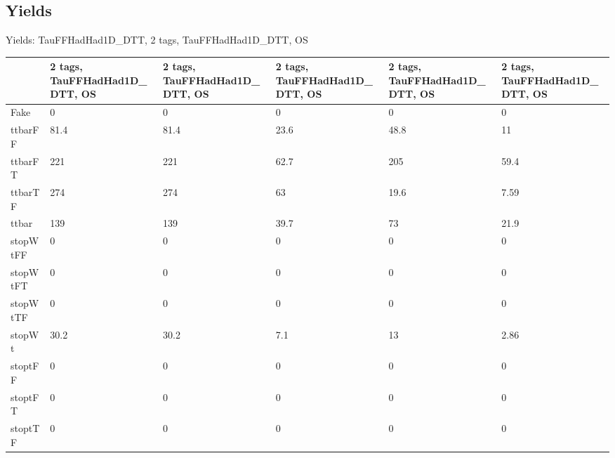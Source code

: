 
\subsection{Yields}

\begin{frame}{Yields: TauFFHadHad1D\_DTT, 2 tags, TauFFHadHad1D\_DTT, OS}
\begin{center}
  \begin{tabular}{l| >{\centering\let\newline\\\arraybackslash\hspace{0pt}}m{1.4cm}| >{\centering\let\newline\\\arraybackslash\hspace{0pt}}m{1.4cm}| >{\centering\let\newline\\\arraybackslash\hspace{0pt}}m{1.4cm}| >{\centering\let\newline\\\arraybackslash\hspace{0pt}}m{1.4cm}| >{\centering\let\newline\\\arraybackslash\hspace{0pt}}m{1.4cm}}
    & 2 tags, TauFFHadHad1D\_DTT, OS & 2 tags, TauFFHadHad1D\_DTT, OS & 2 tags, TauFFHadHad1D\_DTT, OS & 2 tags, TauFFHadHad1D\_DTT, OS & 2 tags, TauFFHadHad1D\_DTT, OS \\
 \hline \hline
    Fake& 0 & 0 & 0 & 0 & 0 \\
 \hline
    ttbarFF& 81.4 & 81.4 & 23.6 & 48.8 & 11 \\
 \hline
    ttbarFT& 221 & 221 & 62.7 & 205 & 59.4 \\
 \hline
    ttbarTF& 274 & 274 & 63 & 19.6 & 7.59 \\
 \hline
    ttbar& 139 & 139 & 39.7 & 73 & 21.9 \\
 \hline
    stopWtFF& 0 & 0 & 0 & 0 & 0 \\
 \hline
    stopWtFT& 0 & 0 & 0 & 0 & 0 \\
 \hline
    stopWtTF& 0 & 0 & 0 & 0 & 0 \\
 \hline
    stopWt& 30.2 & 30.2 & 7.1 & 13 & 2.86 \\
 \hline
    stoptFF& 0 & 0 & 0 & 0 & 0 \\
 \hline
    stoptFT& 0 & 0 & 0 & 0 & 0 \\
 \hline
    stoptTF& 0 & 0 & 0 & 0 & 0 \\

\end{tabular}
\end{center}
\end{frame}
